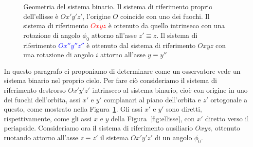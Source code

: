 {\begin{figure}[tb]
  \caption[Geometria del sistema binario]{Geometria del sistema binario. Il
    sistema di riferimento proprio dell'ellisse è $Ox'y'z'$, l'origine $O$
    coincide con uno dei fuochi. Il sistema di riferimento
    \textcolor{red}{$Oxyz$} è ottenuto da quello intrinseco con una rotazione di
    angolo $\phi_0$ attorno all'asse $z' \equiv z$. Il sistema di riferimento
    \textcolor{blue}{$Ox''y''z''$} è ottenuto dal sistema di riferimento $Oxyz$
    con una rotazione di angolo $i$ attorno all'asse $y \equiv y''$}
  \label{fig:geometria-sistema}
\end{figure}
In questo paragrafo ci proponiamo di determinare come un osservatore vede un
sistema binario nel proprio cielo. Per fare ciò consideriamo il sistema di
riferimento destrorso $Ox'y'z'$ intrinseco al sistema binario, cioè con origine
in uno dei fuochi dell'orbita, assi $x'$ e $y'$ complanari al piano dell'orbita
e $z'$ ortogonale a questo, come mostrato nella
Figura~\ref{fig:geometria-sistema}. Gli assi $x'$ e $y'$ sono diretti,
rispettivamente, come gli assi $x$ e $y$ della Figura~\ref{fig:ellisse}, con
$x'$ diretto verso il periapside. Consideriamo ora il sistema di riferimento
ausiliario $Oxyz$, ottenuto ruotando attorno all'asse $z\equiv z'$ il sistema
$Ox'y'z'$ di un angolo $\phi_0$.

}
